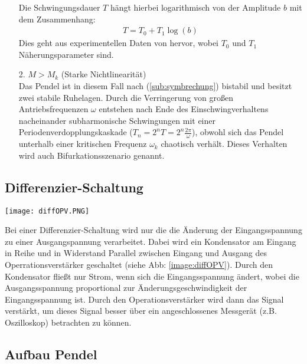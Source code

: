 \begin{itemize}
\begin{center}
        \label{image:resonanzkurve}
    \end{center}
    Die Schwingungsdauer $T$ hängt hierbei logarithmisch von der Amplitude $b$ mit dem Zusammenhang:
    \begin{gather}
        T = T_0 + T_1\log(b)
    \end{gather}
    Dies geht aus experimentellen Daten von \citep{Lueck} hervor, wobei $T_0$ und $T_1$ Näherungsparameter sind. \citep{Lueck}
    \item[2.] $M>M_k$ (Starke Nichtlinearität)\\
    Das Pendel ist in diesem Fall nach (\ref{sub:symbrechung}) bistabil und besitzt zwei stabile Ruhelagen. Durch die Verringerung von großen Antriebsfrequenzen $\omega$ entstehen nach Ende des Einschwingverhaltens nacheinander subharmonische Schwingungen mit einer Periodenverdopplungskaskade ($T_n=2^nT=2^n\frac{2\pi}{\omega}$), obwohl sich das Pendel unterhalb einer kritischen Frequenz $\omega_k$ chaotisch verhält. Dieses Verhalten wird auch Bifurkationsszenario genannt. \citep{Lueck}
\end{itemize}

\subsection{Differenzier-Schaltung}
\label{sub:diffSchaltung}
\begin{center}
    \texttt{[image: diffOPV.PNG]}
    \label{image:diffOPV}
\end{center}
Bei einer Differenzier-Schaltung wird nur die die Änderung der Eingangsspannung zu einer Ausgangspannung verarbeitet. Dabei wird ein Kondensator am Eingang in Reihe und in Widerstand Parallel zwischen Eingang und Ausgang des Operrationsverstärker geschaltet (siehe Abb: \ref{image:diffOPV}). Durch den Kondensator fließt nur Strom, wenn sich die Eingangsspannung ändert, wobei die Ausgangsspannung proportional zur Änderungsgeschwindigkeit der Eingangsspannung ist. Durch den Operationsverstärker wird dann das Signal verstärkt, um dieses Signal besser über ein angeschlossenes Messgerät (z.B. Oszilloskop) betrachten zu können. \citep{electronik}

\subsection{Aufbau Pendel}
\label{sub:aufbauPendel}